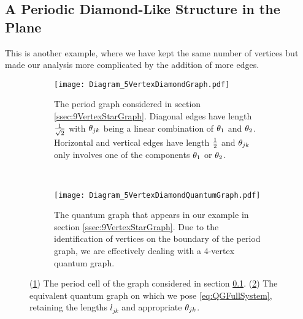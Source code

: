 \subsection{A Periodic Diamond-Like Structure in the Plane} \label{ssec:5VertexDiamondGraph}
This is another example, where we have kept the same number of vertices but made our analysis more complicated by the addition of more edges.
\begin{figure}[t]
	\centering
	\begin{subfigure}[t]{0.45\textwidth}
		\centering
		\texttt{[image: Diagram\_5VertexDiamondGraph.pdf]}
		\caption{\label{fig:Diagram_5VertexDiamondGraph} The period graph considered in section \ref{ssec:9VertexStarGraph}. Diagonal edges have length $\frac{1}{\sqrt{2}}$ with $\theta_{jk}$ being a linear combination of $\theta_1$ and $\theta_2$. Horizontal and vertical edges have length $\frac{1}{2}$ and $\theta_{jk}$ only involves one of the components $\theta_1$ or $\theta_2$.}
	\end{subfigure}
	~
	\begin{subfigure}[t]{0.45\textwidth}
		\centering
		\texttt{[image: Diagram\_5VertexDiamondQuantumGraph.pdf]}
		\caption{\label{fig:Diagram_5VertexDiamondQuantumGraph} The quantum graph that appears in our example in section \ref{ssec:9VertexStarGraph}. Due to the identification of vertices on the boundary of the period graph, we are effectively dealing with a 4-vertex quantum graph.}
	\end{subfigure}
	\caption{\label{fig:5VertexDiamondGraph} (\ref{fig:Diagram_5VertexDiamondGraph}) The period cell of the graph considered in section \ref{ssec:5VertexDiamondGraph}. (\ref{fig:Diagram_5VertexDiamondQuantumGraph}) The equivalent quantum graph on which we pose \eqref{eq:QGFullSystem}, retaining the lengths $l_{jk}$ and appropriate $\theta_{jk}$.}
\end{figure}

